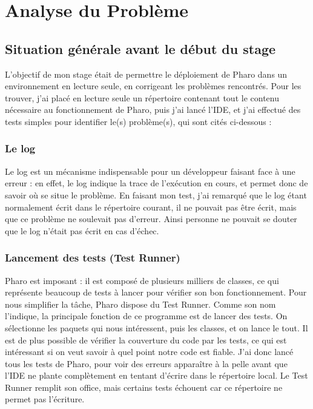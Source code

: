 \section{Analyse du Problème}

\subsection{Situation générale avant le début du stage}
L'objectif de mon stage était de permettre le déploiement de Pharo dans un environnement en lecture seule, en corrigeant les problèmes rencontrés. Pour les trouver, j'ai placé en lecture seule un répertoire contenant tout le contenu nécessaire au fonctionnement de Pharo, puis j'ai lancé l'IDE, et j'ai effectué des tests simples pour identifier le(s) problème(s), qui sont cités ci-dessous :

\subsubsection{Le log}
Le log est un mécanisme indispensable pour un développeur faisant face à une erreur : en effet, le log indique la trace de l'exécution en cours, et permet donc de savoir où se situe le problème. En faisant mon test, j'ai remarqué que le log étant normalement écrit dans le répertoire courant, il ne pouvait pas être écrit, mais que ce problème ne soulevait pas d'erreur. Ainsi personne ne pouvait se douter que le log n'était pas écrit en cas d'échec.

\subsubsection{Lancement des tests (Test Runner)}
Pharo est imposant : il est composé de plusieurs milliers de classes, ce qui représente beaucoup de tests à lancer pour vérifier son bon fonctionnement. Pour nous simplifier la tâche, Pharo dispose du Test Runner. Comme son nom l'indique, la principale fonction de ce programme est de lancer des tests. On sélectionne les paquets qui nous intéressent, puis les classes, et on lance le tout. Il est de plus possible de vérifier la couverture du code par les tests, ce qui est intéressant si on veut savoir à quel point notre code est fiable. J'ai donc lancé tous les tests de Pharo, pour voir des erreurs apparaître à la pelle avant que l'IDE ne plante complètement en tentant d'écrire dans le répertoire local. Le Test Runner remplit son office, mais certains tests échouent car ce répertoire ne permet pas l'écriture.

